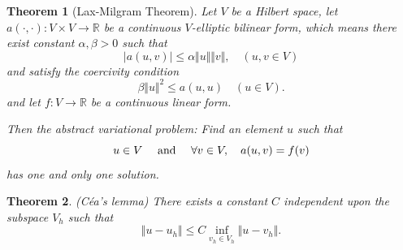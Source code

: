 \documentclass[11pt,letterpaper]{article}
\newtheorem{thm}{Theorem}
\begin{document}
\begin{thm}[Lax-Milgram Theorem]
  \label{eq:lax}
  Let $V$ be a Hilbert space, let $a(\cdot,\cdot):V\times V\rightarrow \mathbb{R}$
  be a continuous $V$-elliptic bilinear form, which means there exist constant $\alpha,\beta>0$
  such that
  \begin{displaymath}
    |a(u,v)|\leq \alpha \Vert u\Vert \Vert v\Vert,\quad (u,v\in V)
  \end{displaymath}
  and satisfy the coercivity condition
  \begin{displaymath}
    \beta\Vert u\Vert^2\leq a(u,u)\quad (u\in V).
  \end{displaymath}
  and let $f:V\rightarrow \mathbb{R}$ be a continuous linear form.

  Then the abstract variational problem: Find an element $u$ such that
  \begin{equation}
    \label{eq:l}
    u\in V\quad \textmd{ and }\quad \forall v\in V,\quad  a(u,v)=f(v)
  \end{equation}
  has one and only one solution.
\end{thm}


\begin{thm}(C\'{e}a's lemma)
  There exists a constant $C$ independent upon the subspace $V_h$ such that
  \begin{displaymath}
    \Vert u-u_h\Vert \leq C\inf_{v_h\in V_h}\Vert u-v_h\Vert.
  \end{displaymath}
\end{thm}
\end{document}
